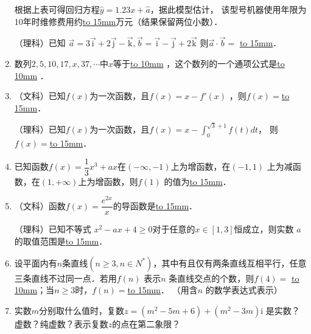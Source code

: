 \documentclass[a4paper]{article}
\begin{document}
\begin{enumerate}
根据上表可得回归方程$\hat y=1.23x+\hat a$，据此模型估计，
该型号机器使用年限为10年时维修费用约\underline{\hbox to 15mm{}}万元（结果保留两位小数）．

（理科）已知 $\vec a = 3\vec {\mathrm{i}} + 2\vec {\mathrm{j}} - \vec {\mathrm{k}},\vec b = \vec {\mathrm{i}} -\vec {\mathrm{j}} + 2\vec {\mathrm{k}}$ 则$\vec a \cdot \vec b=$ \underline{\hbox to 15mm{}}．



 \item   数列$2,5,10,17,x,37,\cdots$中$x$等于\underline{\hbox to 10mm{}}  ，这个数列的一个通项公式是\underline{\hbox to 10mm{}}  ．






\item  （文科）已知$f(x)$为一次函数，且$f(x)=x-f'(x)$ ，则$f(x)=$\underline{\hbox to 15mm{}}．


（理科）已知$f(x)$为一次函数，且$ f(x)=x-\int_0^{\sqrt{3}+1}f(t)dt$， 则$f(x)=$\underline{\hbox to 15mm{}}．








\item    已知函数$f(x) = \dfrac 13 x^3 + ax$在$( - \infty , - 1)$上为增函数，在$( - 1,1)$ 上为减函数，在$(1, + \infty )$上为增函数，则$f(1)$ 的值为\underline{\hbox to 15mm{}}．

\item  （文科）函数$f(x)=\dfrac{e^{2x}}x$的导函数是\underline{\hbox to 15mm{}}．


          （理科）已知不等式 $x^2- ax + 4 \ge 0$对于任意的$x \in [1,3]$恒成立，则实数 $a$ 的取值范围是\underline{\hbox to 15mm{}}．







\item    设平面内有$n$条直线$(n \ge 3,n \in N^*)$，其中有且仅有两条直线互相平行，任意三条直线不过同一点．若用$f(n)$ 表示$n$ 条直线交点的个数，则$f(4)=$ \underline{\hbox to 10mm{}}；当$n \ge 3$时，$f(n)=$\underline{\hbox to 15mm{}}． （用含$n$ 的数学表达式表示）

\newpage






\item     实数$m$分别取什么值时，复数$z=(m^2-5m+6)+(m^2-3m) \mathrm{i}$ 是实数？虚数？纯虚数？表示复数$z$的点在第二象限？


\end{enumerate}
\end{document}
